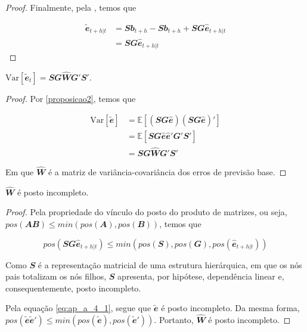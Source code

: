 \begin{apendicesenv}
\begin{proof}
  Finalmente, pela , temos que

  \begin{align}
    \mathbfit{\tilde{e}}_{t+h|t} &=  \mathbfit{Sb}_{t+h} - \mathbfit{Sb}_{t+h}  + \mathbfit{SG\hat{e}}_{t+h|t}  \\
    &= \mathbfit{SG\hat{e}}_{t+h|t}
  \end{align}
\end{proof}

\begin{proposition}
  \label{proposicao3}

  $\text{Var}[\mathbfit{\tilde{e}}_t] = \mathbfit{SG\hat{W}G'S'}$.

\end{proposition}

\begin{proof}
  Por \ref{proposicao2}, temos que

  \begin{align}
    \text{Var}[\mathbfit{\tilde{e}}] &= \mathbb{E}[\mathbfit{(SG\hat{e})(SG\hat {e})'}] \\
    &= \mathbb{E}[\mathbfit{SG\hat{e}\hat{e}'G'S'}] \\
    &= \mathbfit{SG\hat{W}G'S'}
  \end{align}

  Em que $\mathbfit{\hat{W}}$ é a matriz de variância-covariância dos erros de  previsão base.
\end{proof}

\begin{proposition}
  \label{proposicao4}

  $\mathbfit{\hat{W}}$ é posto incompleto.

\end{proposition}

\begin{proof}
  Pela propriedade do vínculo do posto do produto de matrizes, ou seja, $pos(\mathbfit{AB}) \leq min(pos(\mathbfit{A}), pos(\mathbfit{B}))$, temos que
  
  \begin{equation}
    pos(\mathbfit{SG\hat{e}}_{t+h|t}) \leq min(pos(\mathbfit{S}), pos(\mathbfit{G}), pos(\mathbfit{\hat{e}}_{t+h|t})) \label{eq:ap_a_4_1}
  \end{equation}

  Como $\mathbfit{S}$ é a representação matricial de uma estrutura hierárquica, em que os nós pais totalizam os nós filhos, $\mathbfit{S}$ apresenta, por hipótese, dependência linear e, consequentemente, posto incompleto.

  Pela equação \eqref{eq:ap_a_4_1}, segue que $\mathbfit{\tilde{e}}$ é posto incompleto. Da mesma forma, $pos(\mathbfit{\tilde{e}\tilde{e}'}) \leq min(pos(\mathbfit{\tilde{e}}), pos(\mathbfit{\tilde{e}'}))$. Portanto, $\mathbfit{\hat{W}}$ é posto incompleto.
\end{proof}

\end{apendicesenv}

